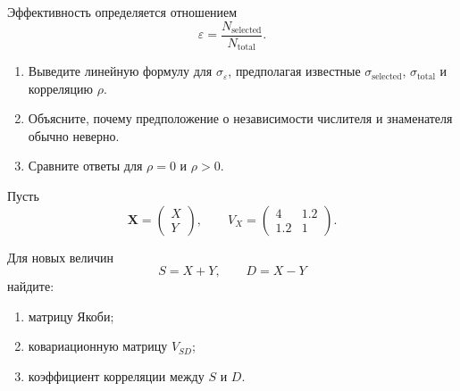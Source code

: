 \documentclass[
  russian,
  11pt,
  a4paper,
  open=any]{scrbook}
\providecommand{\tightlist}{%
  \setlength{\itemsep}{0pt}\setlength{\parskip}{0pt}}
\begin{document}
\begin{semanticpdfbox}[colback=BookCoralSoft,borderline west={1.2mm}{0pt}{BookCoral}]

\par\nopagebreak[4]\vspace{1.2mm}

Эффективность определяется отношением \[
\varepsilon=\frac{N_{\mathrm{selected}}}{N_{\mathrm{total}}}.
\]

\begin{enumerate}
\def\labelenumi{\arabic{enumi}.}
\tightlist
\item
  Выведите линейную формулу для \(\sigma_\varepsilon\), предполагая
  известные \(\sigma_{\mathrm{selected}}\), \(\sigma_{\mathrm{total}}\)
  и корреляцию \(\rho\).
\item
  Объясните, почему предположение о независимости числителя и
  знаменателя обычно неверно.
\item
  Сравните ответы для \(\rho=0\) и \(\rho>0\).
\end{enumerate}

\end{semanticpdfbox}

\begin{semanticpdfbox}[colback=BookCoralSoft,borderline west={1.2mm}{0pt}{BookCoral}]

\par\nopagebreak[4]\vspace{1.2mm}

Пусть \[
\mathbf X=
\begin{pmatrix}X\\Y\end{pmatrix},
\qquad
V_X=
\begin{pmatrix}
4&1.2\\
1.2&1
\end{pmatrix}.
\]

Для новых величин \[
S=X+Y,
\qquad
D=X-Y
\] найдите:

\begin{enumerate}
\def\labelenumi{\arabic{enumi}.}
\tightlist
\item
  матрицу Якоби;
\item
  ковариационную матрицу \(V_{SD}\);
\item
  коэффициент корреляции между \(S\) и \(D\).
\end{enumerate}

\end{semanticpdfbox}
\end{document}
